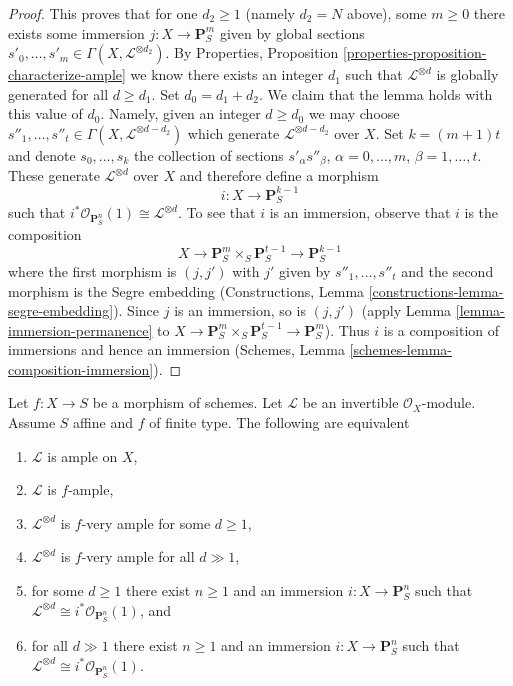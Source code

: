 \begin{proof}
\medskip\noindent
This proves that for one $d_2 \geq 1$
(namely $d_2 = N$ above), some $m \geq 0$ there exists some
immersion $j : X \to \mathbf{P}^m_S$ given by global sections
$s'_0, \ldots, s'_m \in \Gamma(X, \mathcal{L}^{\otimes d_2})$.
By Properties, Proposition \ref{properties-proposition-characterize-ample}
we know there exists an integer
$d_1$ such that $\mathcal{L}^{\otimes d}$ is globally generated
for all $d \geq d_1$. Set $d_0 = d_1 + d_2$. We claim that
the lemma holds with this value of $d_0$. Namely, given
an integer $d \geq d_0$ we may choose $s''_1, \ldots, s''_t
\in \Gamma(X, \mathcal{L}^{\otimes d - d_2})$ which generate
$\mathcal{L}^{\otimes d - d_2}$ over $X$. Set $k = (m + 1)t$ and
denote $s_0, \ldots, s_k$ the collection of sections
$s'_\alpha s''_\beta$, $\alpha = 0, \ldots, m$,
$\beta = 1, \ldots, t$. These generate $\mathcal{L}^{\otimes d}$
over $X$ and therefore define a morphism
$$
i : X \longrightarrow \mathbf{P}^{k - 1}_S
$$
such that $i^*\mathcal{O}_{\mathbf{P}^n_S}(1) \cong \mathcal{L}^{\otimes d}$.
To see that $i$ is an immersion, observe that $i$ is the composition
$$
X \longrightarrow \mathbf{P}^m_S \times_S \mathbf{P}^{t - 1}_S
\longrightarrow \mathbf{P}^{k - 1}_S
$$
where the first morphism is $(j, j')$ with $j'$ given by
$s''_1, \ldots, s''_t$ and the
second morphism is the Segre embedding
(Constructions, Lemma \ref{constructions-lemma-segre-embedding}).
Since $j$ is an immersion, so is $(j, j')$
(apply Lemma \ref{lemma-immersion-permanence}
to $X \to \mathbf{P}^m_S \times_S \mathbf{P}^{t - 1}_S
\to \mathbf{P}^m_S$). Thus $i$ is a composition of
immersions and hence an immersion
(Schemes, Lemma \ref{schemes-lemma-composition-immersion}).
\end{proof}

\begin{lemma}
\label{lemma-finite-type-over-affine-ample-very-ample}
Let $f : X \to S$ be a morphism of schemes.
Let $\mathcal{L}$ be an invertible $\mathcal{O}_X$-module.
Assume $S$ affine and $f$ of finite type.
The following are equivalent
\begin{enumerate}
\item $\mathcal{L}$ is ample on $X$,
\item $\mathcal{L}$ is $f$-ample,
\item $\mathcal{L}^{\otimes d}$ is $f$-very ample for some $d \geq 1$,
\item $\mathcal{L}^{\otimes d}$ is $f$-very ample for all $d \gg 1$,
\item for some $d \geq 1$ there exist $n \geq 1$ and an immersion
$i : X \to \mathbf{P}^n_S$ such that
$\mathcal{L}^{\otimes d} \cong i^*\mathcal{O}_{\mathbf{P}^n_S}(1)$, and
\item for all $d \gg 1$ there exist $n \geq 1$ and an immersion
$i : X \to \mathbf{P}^n_S$ such that
$\mathcal{L}^{\otimes d} \cong i^*\mathcal{O}_{\mathbf{P}^n_S}(1)$.
\end{enumerate}
\end{lemma}

